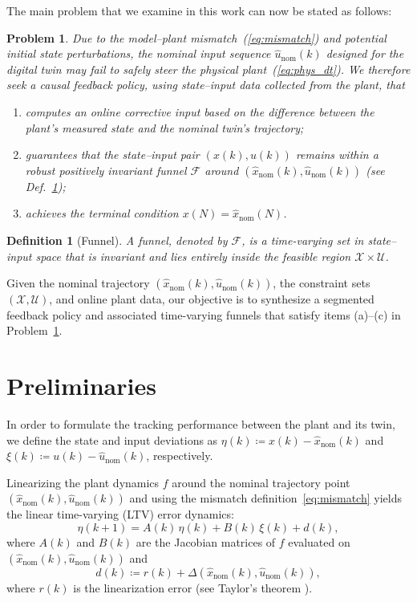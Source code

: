\documentclass[letterpaper, 10 pt, conference]{ieeeconf}
\newtheorem{definition}{Definition}
\newtheorem{problem}{Problem}
\begin{document}
The main problem that we examine in this work can now be stated as follows:
\begin{problem}\label{prob:1}
Due to the model–plant mismatch~(\ref{eq:mismatch}) and potential initial state perturbations, the nominal input sequence ${\hat{u}_{\text{nom}}(k)}$ designed for the digital twin may fail to safely steer the physical plant~(\ref{eq:phys_dt}). We therefore seek a causal feedback policy, using state–input data collected from the plant, that
\begin{enumerate}
  \item[(a)] computes an online corrective input based on the difference between the plant’s measured state and the nominal twin’s trajectory;
  \item[(b)] guarantees that the state–input pair $(x(k),u(k))$ remains within a robust positively invariant funnel $\mathcal{F}$ around $(\hat{x}_{\text{nom}}(k),\hat{u}_{\text{nom}}(k))$ (see Def.~\ref{def:funnel});
  \item[(c)] achieves the terminal condition $x(N)=\hat{x}_{\text{nom}}(N)$.
\end{enumerate}
\end{problem}

\begin{definition}[Funnel]\label{def:funnel}
A funnel, denoted by $\mathcal{F}$, is a time-varying set in state–input space that is invariant and lies entirely inside the feasible region $\mathcal X \times \mathcal U$.
\end{definition}

Given the nominal trajectory $(\hat x_{\text{nom}}(k),\hat u_{\text{nom}}(k))$, the constraint sets $(\mathcal{X},\mathcal{U})$, and online plant data, our objective is to synthesize a segmented feedback policy and associated time-varying funnels that satisfy items (a)–(c) in Problem~\ref{prob:1}.

\section{Preliminaries}
\label{sec:preliminaries}

In order to formulate the tracking performance between the plant and its twin, we define the state and input deviations as $\eta(k) \coloneqq x(k) - \hat{x}_{\text{nom}}(k)$ and $\xi(k)  \coloneqq u(k) - \hat{u}_{\text{nom}}(k)$, respectively.

Linearizing the plant dynamics \(f\) around the nominal trajectory point \((\hat{x}_{\text{nom}}(k), \hat{u}_{\text{nom}}(k))\) and using the mismatch definition~\eqref{eq:mismatch} yields the linear time-varying (LTV) error dynamics:
\begin{equation}\label{eq:eta_ltv}
\eta(k+1) = A(k)\,\eta(k) + B(k)\,\xi(k) + d(k),
\end{equation}
where $A(k)$ and $B(k)$ are the Jacobian matrices of $f$ evaluated on \((\hat{x}_{\text{nom}}(k), \hat{u}_{\text{nom}}(k))\) and
\begin{equation}\label{eq:disturbance}
    d(k) \coloneqq r(k) + \Delta(\hat{x}_{\text{nom}}(k), \hat{u}_{\text{nom}}(k)),
\end{equation}
where \(r(k)\) is the linearization error (see Taylor’s theorem \cite{Rudin1976PMA}).
\end{document}

